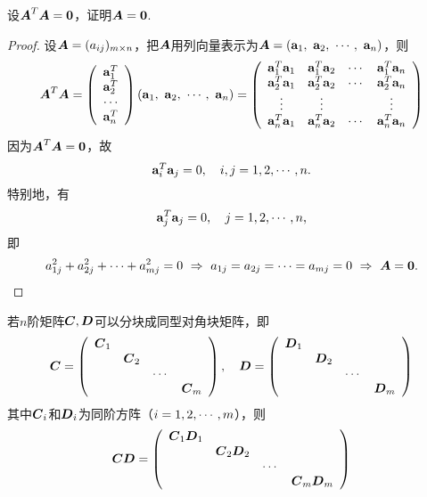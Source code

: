 \begin{frame}\ft{\secname}
\begin{li}
  设$\boldsymbol{A}^T\boldsymbol{A}=\boldsymbol{0}$，证明$\boldsymbol{A}=\boldsymbol{0}$.
\end{li}
\pause
\begin{proof}
设$\boldsymbol{A}=(a_{ij})_{m\times n}$，把$\boldsymbol{A}$用列向量表示为$\boldsymbol{A}=(\mathbf{a}_1, ~\mathbf{a}_2,~\cdots,~\mathbf{a}_n)$，则
$$
\boldsymbol{A}^T\boldsymbol{A} = \left(
  \begin{array}{c}
    \mathbf{a}_1^T\\
    \mathbf{a}_2^T\\
    \cdots \\
    \mathbf{a}_n^T
  \end{array}
\right) (\mathbf{a}_1, ~\mathbf{a}_2,~\cdots,~\mathbf{a}_n) = \left(
  \begin{array}{cccc}
    \mathbf{a}_1^T\mathbf{a}_1 & \mathbf{a}_1^T\mathbf{a}_2 & \cdots & \mathbf{a}_1^T\mathbf{a}_n\\
    \mathbf{a}_2^T\mathbf{a}_1 & \mathbf{a}_2^T\mathbf{a}_2 & \cdots & \mathbf{a}_2^T\mathbf{a}_n\\
    \vdots & \vdots & & \vdots \\
    \mathbf{a}_n^T\mathbf{a}_1 & \mathbf{a}_n^T\mathbf{a}_2 & \cdots & \mathbf{a}_n^T\mathbf{a}_n
  \end{array}
\right)
$$
\pause
因为$\boldsymbol{A}^T\boldsymbol{A}=\boldsymbol{0}$，故
$$
\mathbf{a}_i^T \mathbf{a}_j = 0, \quad i,j=1,2,\cdots,n.
$$
\pause
特别地，有
$$
\mathbf{a}_j^T \mathbf{a}_j = 0, \quad j=1,2,\cdots,n,
$$
即
$$
a_{1j}^2+a_{2j}^2+\cdots+a_{mj}^2=0  ~\Rightarrow~ a_{1j}=a_{2j}=\cdots=a_{mj}=0 ~\Rightarrow~ \boldsymbol{A} = \boldsymbol{0}.
$$
\end{proof}
\end{frame}

\begin{frame}\ft{\secname}

\begin{li}
  若$n$阶矩阵$\boldsymbol{C},\boldsymbol{D}$可以分块成同型对角块矩阵，即
  $$
  \boldsymbol{C} = \left(
    \begin{array}{cccc}
      \boldsymbol{C}_1&&&\\
      &\boldsymbol{C}_2&&\\
      &&\cdots&\\
      &&&\boldsymbol{C}_m
    \end{array}
  \right),\quad
  \boldsymbol{D} = \left(
    \begin{array}{cccc}
      \boldsymbol{D}_1&&&\\
      &\boldsymbol{D}_2&&\\
      &&\cdots&\\
      &&&\boldsymbol{D}_m
    \end{array}
  \right)
  $$
  其中$\boldsymbol{C}_i$和$\boldsymbol{D}_i$为同阶方阵（$i=1,2,\cdots,m$），则
  $$
  \boldsymbol{C}\boldsymbol{D} = \left(
    \begin{array}{cccc}
      \boldsymbol{C}_1\boldsymbol{D}_1&&&\\
      &\boldsymbol{C}_2\boldsymbol{D}_2&&\\
      &&\cdots&\\
      &&&\boldsymbol{C}_m\boldsymbol{D}_m
    \end{array}
  \right)
  $$
\end{li}

\end{frame}

